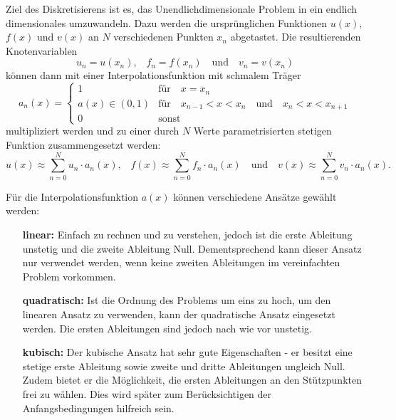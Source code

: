 Ziel des Diskretisierens ist es, das Unendlichdimensionale Problem in ein endlich dimensionales umzuwandeln.
Dazu werden die ursprünglichen Funktionen $u(x)$, $f(x)$ und $v(x)$ an $N$ verschiedenen Punkten $x_n$ abgetastet.
Die resultierenden Knotenvariablen
\begin{equation}
    u_n = u(x_n) 
    \text{,} \quad
    f_n = f(x_n)
    \quad \text{und} \quad
    v_n = v(x_n)
\end{equation}
können dann mit einer Interpolationsfunktion mit schmalem Träger
\begin{equation}
    a_n(x) = \left\{ \begin{array}{ll}
        1
            & \text{für} \quad x = x_n \\
        a(x) \in (0, 1) 
            & \text{für} \quad x_{n-1} < x < x_n \quad \text{und} \quad x_n < x < x_{n+1} \\
        0
            & \text{sonst} 
    \end{array} \right.
\end{equation}
multipliziert werden und zu einer durch $N$ Werte parametrisierten stetigen Funktion zusammengesetzt werden:
\begin{equation}
    u(x) \approx \sum_{n=0}^{N}{u_n \cdot a_n(x)} 
    \text{,} \quad
    f(x) \approx \sum_{n=0}^{N}{f_n \cdot a_n(x)} 
    \quad \text{und} \quad
    v(x) \approx \sum_{n=0}^{N}{v_n \cdot a_n(x)}.
\end{equation}

Für die Interpolationsfunktion $a(x)$ können verschiedene Ansätze gewählt werden:
\begin{itemize}
    \item[\textbf{linear:}] 
        Einfach zu rechnen und zu verstehen, jedoch ist die erste Ableitung unstetig und die zweite Ableitung Null.
        Dementsprechend kann dieser Ansatz nur verwendet werden, wenn keine zweiten Ableitungen im vereinfachten Problem vorkommen.
    \item[\textbf{quadratisch:}]
        Ist die Ordnung des Problems um eins zu hoch, um den linearen Ansatz zu verwenden, kann der quadratische Ansatz eingesetzt werden.
        Die ersten Ableitungen sind jedoch nach wie vor unstetig.
    \item[\textbf{kubisch:}]  
        Der kubische Ansatz hat sehr gute Eigenschaften - er besitzt eine stetige erste Ableitung sowie zweite und dritte Ableitungen ungleich Null. 
        Zudem bietet er die Möglichkeit, die ersten Ableitungen an den Stützpunkten frei zu wählen.
        Dies wird später zum Berücksichtigen der Anfangsbedingungen hilfreich sein.
\end{itemize}

